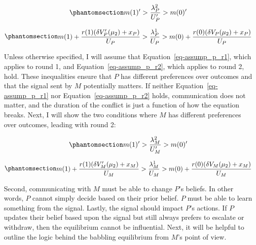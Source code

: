 \documentclass[
  12pt,
]{article}
\theoremstyle{plain}
\theoremstyle{plain}
\theoremstyle{remark}
\begin{document}
\begin{equation}\phantomsection\label{eq-assump_p_r2}{
\begin{aligned}
m(1)' > \frac{\lambda^2_P }{U_P'} >  m(0)'\\
\end{aligned}
}\end{equation}

\begin{equation}\phantomsection\label{eq-assump_p_r1}{
\begin{aligned}
m(1) + \frac{r(1)(\delta V_P'(\mu_2) + x_P)}{U_P} > \frac{\lambda^1_P}{U_P} > m(0) + \frac{r(0)(\delta V_P(\mu_2) + x_P)}{U_P}\\
\end{aligned}
}\end{equation}

Unless otherwise specified, I will assume that
Equation~\ref{eq-assump_p_r1}, which applies to round 1, and
Equation~\ref{eq-assump_p_r2}, which applies to round 2, hold. These
inequalities ensure that \(P\) has different preferences over outcomes
and that the signal sent by \(M\) potentially matters. If neither
Equation~\ref{eq-assump_p_r1} nor Equation~\ref{eq-assump_p_r2} holds,
communication does not matter, and the duration of the conflict is just
a function of how the equation breaks. Next, I will show the two
conditions where \(M\) has different preferences over outcomes, leading
with round 2:

\begin{equation}\phantomsection\label{eq-mpref_r2}{
\begin{aligned}
m(1)' > \frac{\lambda^2_M}{U_M'} > m(0)'\\
\end{aligned}
}\end{equation}

\begin{equation}\phantomsection\label{eq-mpref_r1}{
\begin{aligned}
m(1) + \frac{r(1)(\delta V_M'(\mu_2) + x_M)}{U_M} > \frac{\lambda^1_M}{U_M} > m(0) + \frac{r(0)(\delta V_M(\mu_2) + x_M)}{U_M}\\
\end{aligned}
}\end{equation}

Second, communicating with \(M\) must be able to change \(P\)'s beliefs.
In other words, \(P\) cannot simply decide based on their prior belief.
\(P\) must be able to learn something from the signal. Lastly, the
signal should impact \(P\)'s actions. If \(P\) updates their belief
based upon the signal but still always prefers to escalate or withdraw,
then the equilibrium cannot be influential. Next, it will be helpful to
outline the logic behind the babbling equilibrium from \(M\)'s point of
view.
\end{document}
